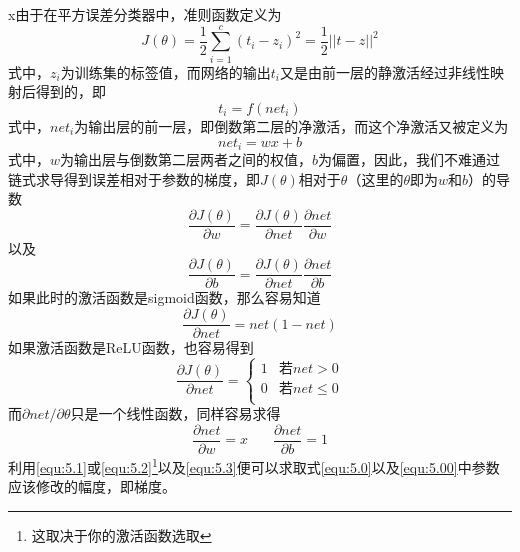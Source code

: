 x由于在平方误差分类器中，准则函数定义为
\begin{equation}
J(\theta) = \frac{1}{2}\sum\limits_{i=1}^c(t_i - z_i)^2 = \frac{1}{2}||t-z||^2
\end{equation}
式中，$z_i$为训练集的标签值，而网络的输出$t_i$又是由前一层的静激活经过非线性映射后得到的，即
\begin{equation}
t_i = f(net_i)
\end{equation}
式中，$net_i$为输出层的前一层，即倒数第二层的净激活，而这个净激活又被定义为
\begin{equation}
net_i = wx + b
\end{equation}
式中，$w$为输出层与倒数第二层两者之间的权值，$b$为偏置，因此，我们不难通过链式求导得到误差相对于参数的梯度，即$J(\theta)$相对于$\theta$（这里的$\theta$即为$w$和$b$）的导数
\begin{equation}
\frac{\partial J(\theta)}{\partial w} = \frac{\partial J(\theta)}{\partial net} \frac{\partial net}{\partial w}\label{equ:5.0}
\end{equation}
以及
\begin{equation}
\frac{\partial J(\theta)}{\partial b} = \frac{\partial J(\theta)}{\partial net} \frac{\partial net}{\partial b}\label{equ:5.00}
\end{equation}
如果此时的激活函数是sigmoid函数，那么容易知道
\begin{equation}
\frac{\partial J(\theta)}{\partial net} = net(1-net)\label{equ:5.1}
\end{equation}
如果激活函数是ReLU函数，也容易得到
\begin{equation}
\frac{\partial J(\theta)}{\partial net} = \left\{
\begin{array}{cc}
1 & \text{若}net>0\\
0 &\text{若}net\leq 0\\
\end{array}
\right.\label{equ:5.2}
\end{equation}
而$\partial net/\partial \theta$只是一个线性函数，同样容易求得
\begin{equation}
\frac{\partial net}{\partial w} = x~~~~~~~~\frac{\partial net}{\partial b} = 1\label{equ:5.3}
\end{equation}
利用\eqref{equ:5.1}或\eqref{equ:5.2}\footnote{这取决于你的激活函数选取}以及\eqref{equ:5.3}便可以求取式\eqref{equ:5.0}以及\eqref{equ:5.00}中参数应该修改的幅度，即梯度。






